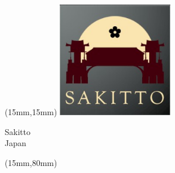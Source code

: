 \begin{textblock*}{50mm}(15mm,15mm)%
\includegraphics[width=50mm]{LG/2015-05-20_00093.png}
\par Sakitto\\ Japan
\end{textblock*}
\begin{textblock*}{185mm}(15mm,80mm)%
\end{textblock*}
